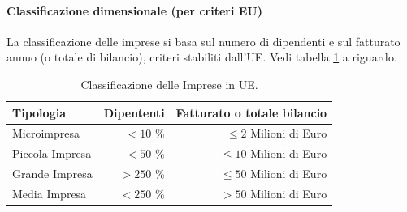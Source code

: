 %
\paragraph{Classificazione dimensionale (per criteri EU)}
La classificazione delle imprese si basa sul numero di dipendenti e sul fatturato annuo (o totale di bilancio), criteri stabiliti dall'UE. Vedi tabella \ref{tab:class_imp} a riguardo.
\begin{table}
    \centering
    \begin{tabular}{lrr}%
        \toprule
        \textbf{Tipologia} & \textbf{Dipententi} & \textbf{Fatturato o totale bilancio} \\
        \midrule
        Microimpresa       & $ <10 $ \%          & $ \leq 2 $ Milioni di Euro           \\
        Piccola Impresa    & $ <50 $ \%          & $ \leq 10 $ Milioni di Euro          \\
        Grande Impresa     & $ >250 $ \%         & $ \leq 50 $ Milioni di Euro          \\
        Media Impresa      & $ <250 $ \%         & $ >50 $ Milioni di Euro              \\
        \bottomrule
    \end{tabular}
    \caption{Classificazione delle Imprese in UE.}\label{tab:class_imp}
\end{table}
